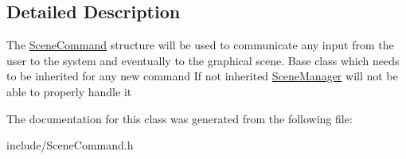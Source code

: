 \subsection{Detailed Description}
The \hyperlink{class_scene_command}{SceneCommand} structure will be used to communicate any input from the user to the system and eventually to the graphical scene. Base class which needs to be inherited for any new command If not inherited \hyperlink{class_scene_manager}{SceneManager} will not be able to properly handle it 

The documentation for this class was generated from the following file:\begin{DoxyCompactItemize}
\item 
include/SceneCommand.h\end{DoxyCompactItemize}
